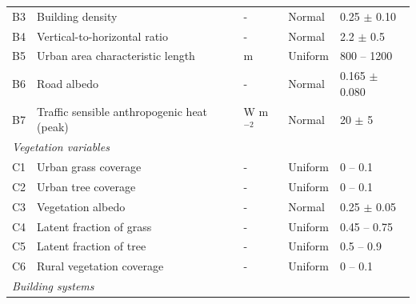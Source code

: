 \begin{table}[]
\begin{center}
{\begin{tabular}{lllll}
\hspace{6pt}B3  & Building density                             & -           & Normal       & 0.25 $\pm$ 0.10   \\
\hspace{6pt}B4  & Vertical-to-horizontal ratio                 & -           & Normal       & 2.2 $\pm$ 0.5     \\
\hspace{6pt}B5  & Urban area characteristic length             & m           & Uniform      & 800 -- 1200    \\
\hspace{6pt}B6  & Road albedo                                  & -           & Normal       & 0.165 $\pm$ 0.080 \\
\hspace{6pt}B7  & Traffic sensible anthropogenic heat (peak)   & W m$^{-2}$       & Normal       & 20 $\pm$ 5   \vspace{6pt}     \\
\multicolumn{5}{l}{\textit{Vegetation variables}\vspace{6pt}}                                               \\
\hspace{6pt}C1  & Urban grass coverage                         & -           & Uniform      & 0 -- 0.1       \\
\hspace{6pt}C2  & Urban tree coverage                          & -           & Uniform      & 0 -- 0.1       \\
\hspace{6pt}C3  & Vegetation albedo                            & -           & Normal       & 0.25 $\pm$ 0.05   \\
\hspace{6pt}C4  & Latent fraction of grass                     & -           & Uniform      & 0.45 -- 0.75   \\
\hspace{6pt}C5  & Latent fraction of tree                      & -           & Uniform      & 0.5 -- 0.9     \\
\hspace{6pt}C6  & Rural vegetation coverage                    & -           & Uniform      & 0 -- 0.1  \vspace{6pt}     \\
\multicolumn{5}{l}{\textit{Building systems}\vspace{6pt}}                                                   \\

\end{tabular}}
\end{center}
\end{table}
